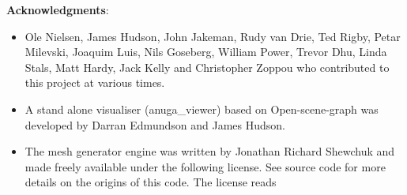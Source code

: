 \pagebreak
\textbf{Acknowledgments}:
\begin{itemize}
\item Ole Nielsen, James Hudson, John Jakeman, Rudy van Drie, Ted Rigby, 
      Petar Milevski, Joaquim Luis, Nils Goseberg, William Power,
      Trevor Dhu, Linda Stals, Matt Hardy, Jack Kelly and Christopher
      Zoppou who contributed to this project at various times.
\item A stand alone visualiser (anuga\_viewer) based on Open-scene-graph was developed by Darran Edmundson and James Hudson.
\item The mesh generator engine was written by Jonathan Richard Shewchuk and made freely
      available under the following license.  See source code  for more
      details on the origins of this code. The license reads


\end{itemize}
